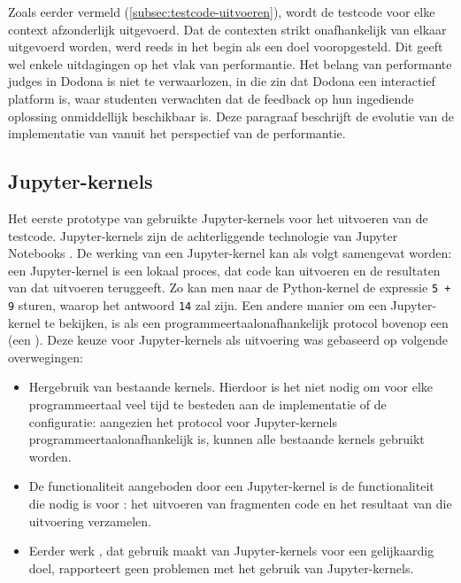 Zoals eerder vermeld (\cref{subsec:testcode-uitvoeren}), wordt de testcode voor elke context afzonderlijk uitgevoerd.
Dat de contexten strikt onafhankelijk van elkaar uitgevoerd worden, werd reeds in het begin als een doel vooropgesteld.
Dit geeft wel enkele uitdagingen op het vlak van performantie.
Het belang van performante judges in Dodona is niet te verwaarlozen, in die zin dat Dodona een interactief platform is, waar studenten verwachten dat de feedback op hun ingediende oplossing onmiddellijk beschikbaar is.
Deze paragraaf beschrijft de evolutie van de implementatie van \tested{} vanuit het perspectief van de performantie.

\subsection{Jupyter-kernels}\label{subsec:jupyter-kernels}

Het eerste prototype van \tested{} gebruikte Jupyter-kernels voor het uitvoeren van de testcode.
Jupyter-kernels zijn de achterliggende technologie van Jupyter Notebooks \autocite{jupyter2016}.
De werking van een Jupyter-kernel kan als volgt samengevat worden: een Jupyter-kernel is een lokaal proces, dat code kan uitvoeren en de resultaten van dat uitvoeren teruggeeft.
Zo kan men naar de Python-kernel de expressie \texttt{5 + 9} sturen, waarop het antwoord \texttt{14} zal zijn.
Een andere manier om een Jupyter-kernel te bekijken, is als een programmeertaalonafhankelijk protocol bovenop een  (een ).
Deze keuze voor Jupyter-kernels als uitvoering was gebaseerd op volgende overwegingen:
\begin{itemize}
    \item Hergebruik van bestaande kernels.
    Hierdoor is het niet nodig om voor elke programmeertaal veel tijd te besteden aan de implementatie of de configuratie: aangezien het protocol voor Jupyter-kernels programmeertaalonafhankelijk is, kunnen alle bestaande kernels gebruikt worden.
    \item De functionaliteit aangeboden door een Jupyter-kernel is de functionaliteit die nodig is voor \tested{}: het uitvoeren van fragmenten code en het resultaat van die uitvoering verzamelen.
    \item Eerder werk \autocite{petegem2018}, dat gebruik maakt van Jupyter-kernels voor een gelijkaardig doel, rapporteert geen problemen met het gebruik van Jupyter-kernels.
\end{itemize}


